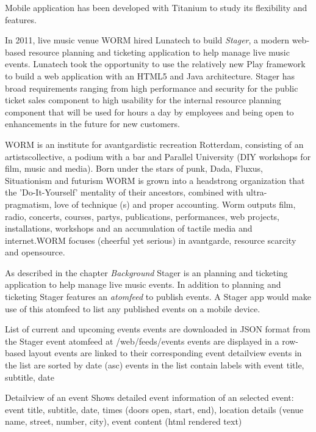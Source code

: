 
Mobile application has been developed with Titanium to study its flexibility and features.


In 2011, live music venue WORM hired Lunatech to build \emph{Stager}, a modern web-based resource planning and ticketing application to help manage live music events. Lunatech took the opportunity to use the relatively new Play framework to build a web application with an HTML5 and Java architecture. Stager has broad requirements ranging from high performance and security for the public ticket sales component to high usability for the internal resource planning component that will be used for hours a day by employees and being open to enhancements in the future for new customers. \cite{Lunatech2011}

WORM is an institute for avantgardistic recreation Rotterdam, consisting of an artistscollective, a podium with a bar and Parallel University (DIY workshops for film, music and media). Born under the stars of punk, Dada, Fluxus, Situationism and futurism WORM is grown into a headstrong organization that the 'Do-It-Yourself' mentality of their ancestors, combined with ultra-pragmatism, love of technique (s) and proper accounting. Worm outputs film, radio, concerts, courses, partys, publications, performances, web projects, installations, workshops and an accumulation of tactile media and internet.WORM focuses (cheerful yet serious) in avantgarde, resource scarcity and opensource. \cite{WORM2012}

As described in the chapter \emph{Background} Stager is an planning and ticketing application to help manage live music events. In addition to planning and ticketing Stager features an \emph{atomfeed} to publish events. A Stager app would make use of this atomfeed to list any published events on a mobile device.



List of current and upcoming events
events are downloaded in JSON format from the Stager event atomfeed at /web/feeds/events
events are displayed in a row-based layout
events are linked to their corresponding event detailview
events in the list are sorted by date (asc)
events in the list contain labels with event title, subtitle, date

Detailview of an event
Shows detailed event information of an selected event:
event title, 
subtitle, 
date, 
times (doors open, start, end), 
location details (venue name, street, number, city), 
event content (html rendered text)

